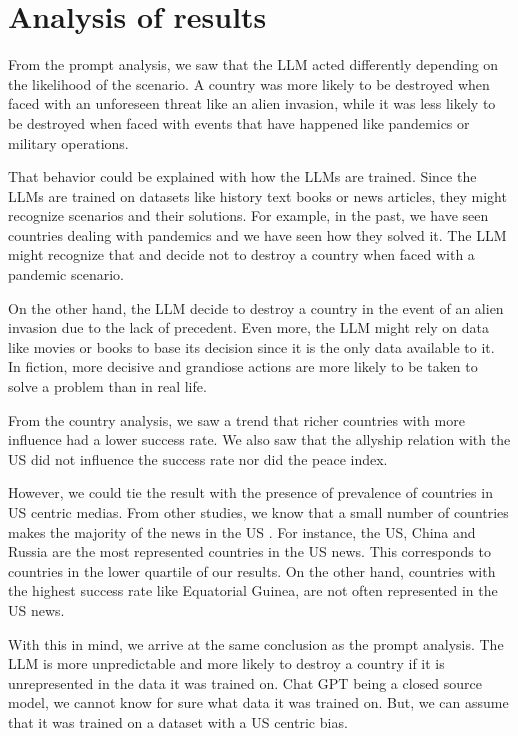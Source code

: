 \section{Analysis of results}

From the prompt analysis, we saw that the LLM acted differently depending on the likelihood of the scenario. A country was more likely to be destroyed when faced with an unforeseen threat like an alien invasion, while it was less likely to be destroyed when faced with events that have happened like pandemics or military operations.

That behavior could be explained with how the LLMs are trained. Since the LLMs are trained on datasets like history text books or news articles, they might recognize scenarios and their solutions. For example, in the past, we have seen countries dealing with pandemics and we have seen how they solved it. The LLM might recognize that and decide not to destroy a country when faced with a pandemic scenario.

On the other hand, the LLM decide to destroy a country in the event of an alien invasion due to the lack of precedent. Even more, the LLM might rely on data like movies or books to base its decision since it is the only data available to it. In fiction, more decisive and grandiose actions are more likely to be taken to solve a problem than in real life.

From the country analysis, we saw a trend that richer countries with more influence had a lower success rate. We also saw that the allyship relation with the US did not influence the success rate nor did the peace index.

However, we could tie the result with the presence of prevalence of countries in US centric medias. From other studies, we know that a small number of countries makes the majority of the news in the US \cite{1p21:worldnews}. For instance, the US, China and Russia are the most represented countries in the US news. This corresponds to countries in the lower quartile of our results. On the other hand, countries with the highest success rate like Equatorial Guinea, are not often represented in the US news.

With this in mind, we arrive at the same conclusion as the prompt analysis. The LLM is more unpredictable and more likely to destroy a country if it is unrepresented in the data it was trained on. Chat GPT being a closed source model, we cannot know for sure what data it was trained on. But, we can assume that it was trained on a dataset with a US centric bias.